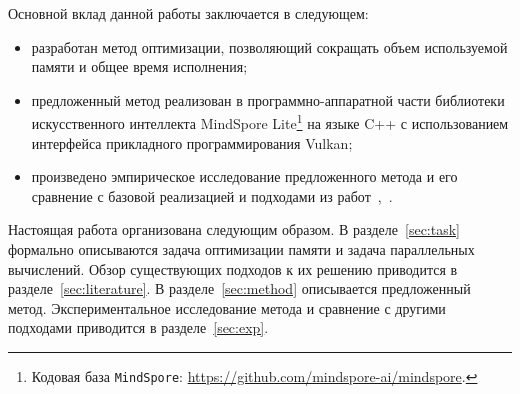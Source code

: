 Основной вклад данной работы заключается в следующем:
\begin{itemize}
    \item разработан метод оптимизации, позволяющий сокращать объем используемой
    памяти и общее время исполнения;
    \item предложенный метод реализован в программно-аппаратной части библиотеки
    искусственного интеллекта MindSpore Lite\footnote{Кодовая база
    \texttt{MindSpore}: \url{https://github.com/mindspore-ai/mindspore}.} на
    языке C++ с использованием интерфейса прикладного программирования Vulkan;
    \item произведено эмпирическое исследование предложенного метода и его
    сравнение с базовой реализацией и подходами из
    работ~\cite{pisarchyk2020efficient},~\cite{node_level_par}.
\end{itemize}

Настоящая работа организована следующим образом. В разделе~\ref{sec:task}
формально описываются задача оптимизации памяти и задача параллельных
вычислений. Обзор существующих подходов к их решению приводится в
разделе~\ref{sec:literature}. В разделе~\ref{sec:method} описывается
предложенный метод. Экспериментальное исследование метода и сравнение с другими
подходами приводится в разделе~\ref{sec:exp}.
